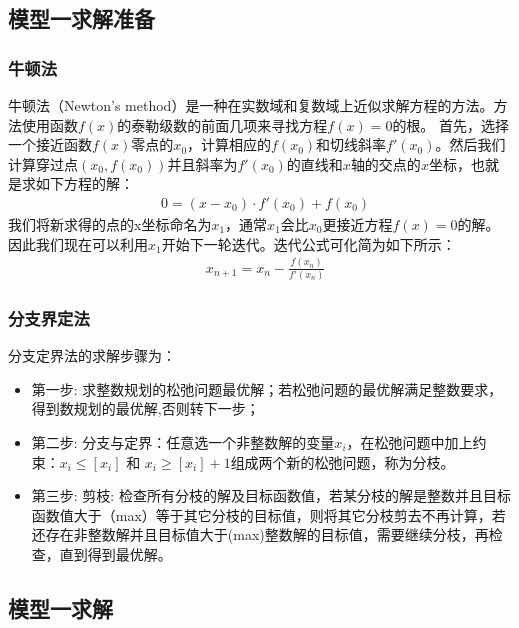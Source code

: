 \documentclass[withoutpreface,bwprint]{cumcmthesis} %
\begin{document}
\subsection{模型一求解准备}
\subsubsection{牛顿法}
牛顿法（Newton's method）是一种在实数域和复数域上近似求解方程的方法。方法使用函数$f(x)$的泰勒级数的前面几项来寻找方程$f(x)=0$的根。
首先，选择一个接近函数$f(x)$零点的$x_{0}$，计算相应的$f(x_0)$和切线斜率$f'(x_0)$。然后我们计算穿过点$(x_0,f(x_0))$并且斜率为$f'(x_0)$的直线和$x$轴的交点的$x$坐标，也就是求如下方程的解：
\begin{align*}
    &0=(x-x_0)\cdot f'(x_0)+f(x_0)
\end{align*}
我们将新求得的点的x坐标命名为$x_1$，通常$x_1$会比$x_0$更接近方程$f(x)=0$的解。因此我们现在可以利用$x_1$开始下一轮迭代。迭代公式可化简为如下所示：
\begin{align*}
    &x_{n+1}=x_n-\frac{f(x_n)}{f'(x_n)}
\end{align*}

\subsubsection{分支界定法}
分支定界法的求解步骤为：
\begin{itemize}
    \item 第一步: 求整数规划的松弛问题最优解；若松弛问题的最优解满足整数要求，得到数规划的最优解,否则转下一步；
    
    \item 第二步: 分支与定界：任意选一个非整数解的变量$x_i$，在松弛问题中加上约束：$x_i≤[x_i]$ 和 $x_i≥[x_i]+1$组成两个新的松弛问题，称为分枝。
    
    \item 第三步: 剪枝: 检查所有分枝的解及目标函数值，若某分枝的解是整数并且目标函数值大于（max）等于其它分枝的目标值，则将其它分枝剪去不再计算，若还存在非整数解并且目标值大于(max)整数解的目标值，需要继续分枝，再检查，直到得到最优解。
\end{itemize}

\subsection{模型一求解}
\end{document}
